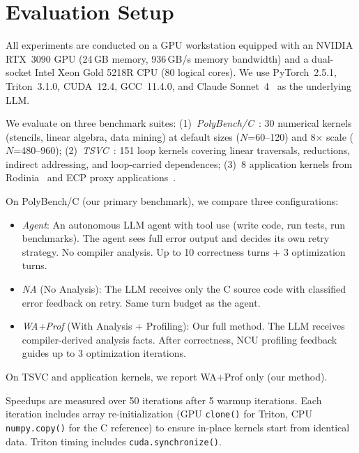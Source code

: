 
\section{Evaluation Setup}

All experiments are conducted on a GPU workstation equipped with an NVIDIA RTX~3090 GPU (24\,GB memory, 936\,GB/s memory bandwidth) and a dual-socket Intel Xeon Gold 5218R CPU (80 logical cores).
We use PyTorch~2.5.1, Triton~3.1.0, CUDA~12.4, GCC~11.4.0, and Claude Sonnet~4~\cite{anthropic2025claude} as the underlying LLM.

We evaluate on three benchmark suites:
(1)~\emph{PolyBench/C}~\cite{polybench}: 30 numerical kernels (stencils, linear algebra, data mining) at default sizes ($N$=60--120) and 8$\times$ scale ($N$=480--960);
(2)~\emph{TSVC}~\cite{callahan1988tsvc}: 151 loop kernels covering linear traversals, reductions, indirect addressing, and loop-carried dependences;
(3)~8 application kernels from Rodinia~\cite{che2009rodinia} and ECP proxy applications~\cite{heroux2009mantevo}.

On PolyBench/C (our primary benchmark), we compare three configurations:
\begin{itemize}
\item \emph{Agent}: An autonomous LLM agent with tool use (write code, run tests, run benchmarks). The agent sees full error output and decides its own retry strategy. No compiler analysis. Up to 10 correctness turns + 3 optimization turns.
\item \emph{NA} (No Analysis): The LLM receives only the C source code with classified error feedback on retry. Same turn budget as the agent.
\item \emph{WA+Prof} (With Analysis + Profiling): Our full method. The LLM receives compiler-derived analysis facts. After correctness, NCU profiling feedback guides up to 3 optimization iterations.
\end{itemize}
On TSVC and application kernels, we report WA+Prof only (our method).

Speedups are measured over 50 iterations after 5 warmup iterations. Each iteration includes array re-initialization (GPU \texttt{clone()} for Triton, CPU \texttt{numpy.copy()} for the C reference) to ensure in-place kernels start from identical data. Triton timing includes \texttt{cuda.synchronize()}.
